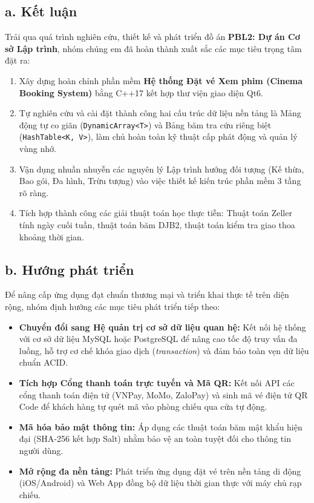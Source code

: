 \documentclass[12pt,a4paper]{article}
\begin{document}
\subsection*{a. Kết luận}
Trải qua quá trình nghiên cứu, thiết kế và phát triển đồ án \textbf{PBL2: Dự án Cơ sở Lập trình}, nhóm chúng em đã hoàn thành xuất sắc các mục tiêu trọng tâm đặt ra:
\begin{enumerate}
    \item Xây dựng hoàn chỉnh phần mềm \textbf{Hệ thống Đặt vé Xem phim (Cinema Booking System)} bằng C++17 kết hợp thư viện giao diện Qt6.
    \item Tự nghiên cứu và cài đặt thành công hai cấu trúc dữ liệu nền tảng là Mảng động tự co giãn (\texttt{DynamicArray<T>}) và Bảng băm tra cứu riêng biệt (\texttt{HashTable<K, V>}), làm chủ hoàn toàn kỹ thuật cấp phát động và quản lý vùng nhớ.
    \item Vận dụng nhuần nhuyễn các nguyên lý Lập trình hướng đối tượng (Kế thừa, Bao gói, Đa hình, Trừu tượng) vào việc thiết kế kiến trúc phần mềm 3 tầng rõ ràng.
    \item Tích hợp thành công các giải thuật toán học thực tiễn: Thuật toán Zeller tính ngày cuối tuần, thuật toán băm DJB2, thuật toán kiểm tra giao thoa khoảng thời gian.
\end{enumerate}

\subsection*{b. Hướng phát triển}
Để nâng cấp ứng dụng đạt chuẩn thương mại và triển khai thực tế trên diện rộng, nhóm định hướng các mục tiêu phát triển tiếp theo:
\begin{itemize}
    \item \textbf{Chuyển đổi sang Hệ quản trị cơ sở dữ liệu quan hệ:} Kết nối hệ thống với cơ sở dữ liệu MySQL hoặc PostgreSQL để nâng cao tốc độ truy vấn đa luồng, hỗ trợ cơ chế khóa giao dịch (\textit{transaction}) và đảm bảo toàn vẹn dữ liệu chuẩn ACID.
    \item \textbf{Tích hợp Cổng thanh toán trực tuyến và Mã QR:} Kết nối API các cổng thanh toán điện tử (VNPay, MoMo, ZaloPay) và sinh mã vé điện tử QR Code để khách hàng tự quét mã vào phòng chiếu qua cửa tự động.
    \item \textbf{Mã hóa bảo mật thông tin:} Áp dụng các thuật toán băm mật khẩu hiện đại (SHA-256 kết hợp Salt) nhằm bảo vệ an toàn tuyệt đối cho thông tin người dùng.
    \item \textbf{Mở rộng đa nền tảng:} Phát triển ứng dụng đặt vé trên nền tảng di động (iOS/Android) và Web App đồng bộ dữ liệu thời gian thực với máy chủ rạp chiếu.
\end{itemize}
\end{document}
